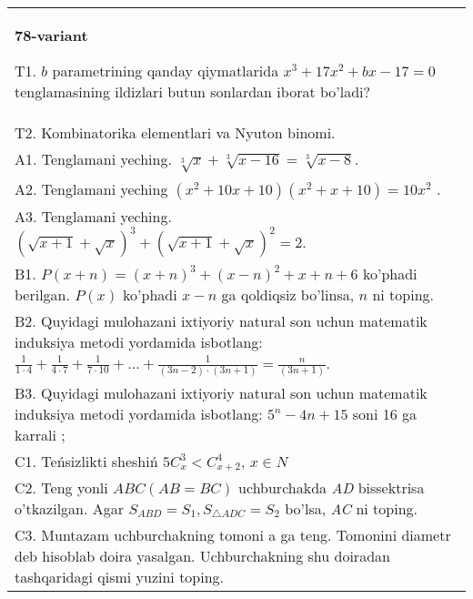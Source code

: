 \documentclass{article}
\begin{document}
\begin{tabular}{m{17cm}}
\textbf{78-variant}
\newline

T1. \(b\) parametrining qanday qiymatlarida \(x^{3} + 17x^{2} + bx - 17 = 0\) tenglamasining ildizlari butun sonlardan iborat bo'ladi? \\
T2. Kombinatorika elementlari va Nyuton binomi. \\
A1. Tenglamani yeching. \(\sqrt[3]{x} + \sqrt[3]{x - 16} = \sqrt[3]{x - 8}\). \\
A2. Tenglamani yeching \(\left( x^{2} + 10x + 10 \right)\left( x^{2} + x + 10 \right) = 10x^{2}\) . \\
A3. Tenglamani yeching. \((\sqrt{x + 1} + \sqrt{x})^{3} + (\sqrt{x + 1} + \sqrt{x})^{2} = 2\). \\
B1. \(P(x + n) = (x + n)^{3} + (x - n)^{2} + x + n + 6\) ko'phadi berilgan. \(P(x)\) ko'phadi \(x - n\) ga qoldiqsiz bo'linsa, \(n\) ni toping. \\
B2. Quyidagi mulohazani ixtiyoriy natural son uchun matematik induksiya metodi yordamida isbotlang: \(\frac{1}{1 \cdot 4} + \frac{1}{4 \cdot 7} + \frac{1}{7 \cdot 10} + \ldots + \frac{1}{(3n - 2) \cdot (3n + 1)} = \frac{n}{(3n + 1)}\). \\
B3. Quyidagi mulohazani ixtiyoriy natural son uchun matematik induksiya metodi yordamida isbotlang: \(5^{n} - 4n + 15\) soni 16 ga karrali ; \\
C1. Teńsizlikti sheshiń \(5C_{x}^{3} < C_{x + 2}^{4}\), \(x \in N\) \\
C2. Teng yonli \(ABC(AB = BC)\) uchburchakda \emph{AD} bissektrisa o'tkazilgan. Agar \(S_{ABD} = S_{1},S_{\bigtriangleup ADC} = S_{2}\) bo'lsa, \emph{AC} ni toping. \\
C3. Muntazam uchburchakning tomoni a ga teng. Tomonini diametr deb hisoblab doira yasalgan. Uchburchakning shu doiradan tashqaridagi qismi yuzini toping. \\

\end{tabular}
\vspace{1cm}
\end{document}
